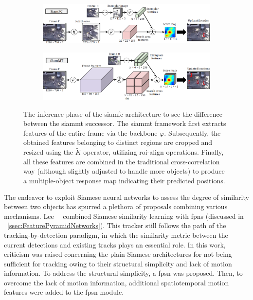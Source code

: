 \begin{figure}[!t]
    \centering
    \begin{subfigure}[b]{\textwidth}
        \centering
        \includegraphics[width=\textwidth]{figures/theoretical_foundations/siammt_orig.png}
        \caption[]{}
    \end{subfigure}
    \begin{subfigure}[b]{\textwidth}
        \centering
        \includegraphics[width=\textwidth]{figures/theoretical_foundations/siammt_new.png}
        \caption[]{}
    \end{subfigure}
    \caption[\Gls{siammt} architecture]{The inference phase of the  \gls{siamfc} architecture to see the difference between the  \gls{siammt} successor. The \gls{siammt} framework first extracts features of the entire frame via the backbone $\varphi$. Subsequently, the obtained features belonging to distinct regions are cropped and resized using the $\tilde{K}$ operator, utilizing \gls{roi}-align operations. Finally, all these features are combined in the traditional cross-correlation way (although slightly adjusted to handle more objects) to produce a multiple-object response map indicating their predicted positions. }
    \label{fig:SiamMTArchitecture}
\end{figure}

The endeavor to exploit Siamese neural networks to assess the degree of similarity between two objects has spurred a plethora of proposals combining various mechanisms. Lee~\etal{}~\cite{lee2019motfpsn} combined Siamese similarity learning with \Glspl{fpn} (discussed in \sectiontext{}~\ref{ssec:FeaturePyramidNetworks}). This tracker still follows the path of the tracking-by-detection paradigm, in which the similarity metric between the current detections and existing tracks plays an essential role. In this work, criticism was raised concerning the plain Siamese architectures for not being sufficient for tracking owing to their structural simplicity and lack of motion information. To address the structural simplicity, a \gls{fpsn} was proposed. Then, to overcome the lack of motion information, additional spatiotemporal motion features were added to the \gls{fpsn} module.

